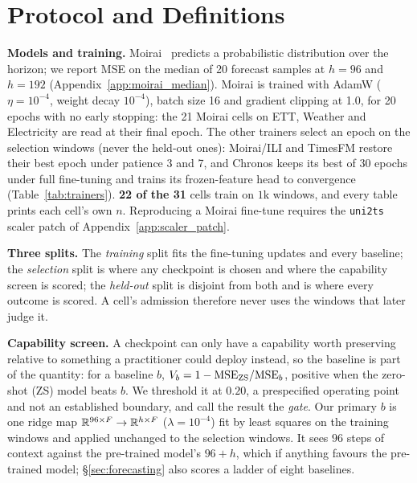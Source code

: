 \section{Protocol and Definitions}
\label{sec:method}

\textbf{Models and training.}
Moirai~\citep{woo2024moirai} predicts a probabilistic distribution over the
horizon; we report MSE on the median of 20 forecast samples at $h{=}96$ and
$h{=}192$ (Appendix~\ref{app:moirai_median}).  Moirai is trained with AdamW
($\eta{=}10^{-4}$, weight decay $10^{-4}$), batch size 16 and gradient clipping
at 1.0, for 20 epochs with no early stopping: the 21 Moirai cells on ETT, Weather and
Electricity are read at their final epoch.  The other trainers select an epoch on
the selection windows (never the held-out ones): Moirai/ILI and TimesFM restore
their best epoch under patience 3 and 7, and Chronos keeps its best of 30 epochs
under full fine-tuning and trains its frozen-feature head to convergence
(Table~\ref{tab:trainers}).  \textbf{22 of the 31} cells train on $1{\text{k}}$
windows, and every table prints each cell's own $n$.  Reproducing a Moirai
fine-tune requires the \texttt{uni2ts} scaler patch of
Appendix~\ref{app:scaler_patch}.

\textbf{Three splits.}  The \emph{training} split fits the fine-tuning updates
and every baseline; the \emph{selection} split is where any checkpoint is chosen
and where the capability screen is scored; the \emph{held-out} split is disjoint
from both and is where every outcome is scored.  A cell's admission therefore
never uses the windows that later judge it.

\textbf{Capability screen.}  A checkpoint can only have a capability worth
preserving relative to something a practitioner could deploy instead, so the
baseline is part of the quantity: for a baseline $b$,
$V_{b} = 1-\text{MSE}_\text{ZS}/\text{MSE}_b$, positive when the zero-shot (ZS)
model beats $b$.  We threshold it at $0.20$, a prespecified operating point and
not an established boundary, and call the result the \emph{gate}.  Our primary
$b$ is one ridge map $\mathbb{R}^{96 \times F} \to \mathbb{R}^{h \times F}$ ($\lambda{=}10^{-4}$)
fit by least squares on the training windows and applied unchanged to the
selection windows.  It sees $96$ steps of context against the pre-trained
model's $96{+}h$, which if anything favours the pre-trained model;
\S\ref{sec:forecasting} also scores a ladder of eight baselines.

